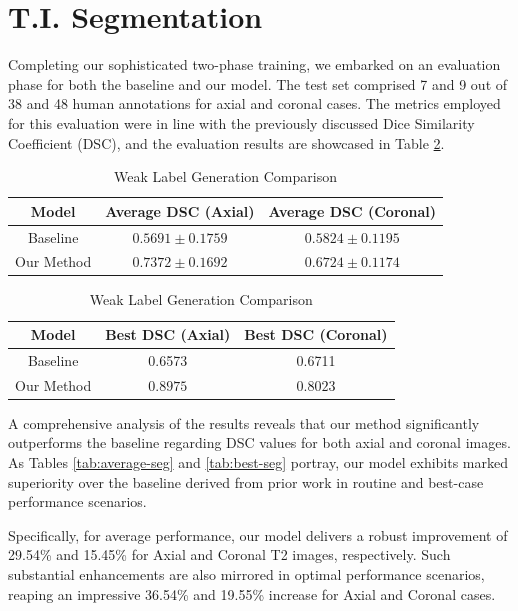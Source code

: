 \section{T.I. Segmentation}
Completing our sophisticated two-phase training, we embarked on an evaluation phase for both the baseline and our model. The test set comprised 7 and 9 out of 38 and 48 human annotations for axial and coronal cases. The metrics employed for this evaluation were in line with the previously discussed Dice Similarity Coefficient (DSC), and the evaluation results are showcased in Table \ref{tab:seg}. 
\begin{table}[ht]
    \begin{subtable}[b]{\textwidth}
        \centering
        \begin{tabular}{c | c | c}
        Model & Average DSC (Axial) & Average DSC (Coronal) \\
        \hline
        Baseline & \(0.5691 \pm 0.1759\)  & \(0.5824 \pm 0.1195\)\\
        \hline
        Our Method & \(\mathbf{0.7372 \pm 0.1692}\) & \(\mathbf{0.6724 \pm 0.1174}\) 
       \end{tabular}
       \caption{Average Case Comparison}
       \label{tab:average-seg}
    \end{subtable}
    \vfill
    \begin{subtable}[b]{\textwidth}
        \centering
        \begin{tabular}{c | c | c}
        Model & Best DSC (Axial) & Best DSC (Coronal) \\
        \hline
        Baseline & 0.6573 & 0.6711\\
        \hline
        Our Method & \(\mathbf{0.8975}\) & \(\mathbf{0.8023}\)
       \end{tabular}
       \caption{Best Case Comparison}
       \label{tab:best-seg}
    \end{subtable}
     \caption{Weak Label Generation Comparison}
     \label{tab:seg}
\end{table}

A comprehensive analysis of the results reveals that our method significantly outperforms the baseline regarding DSC values for both axial and coronal images. As Tables \ref{tab:average-seg} and \ref{tab:best-seg} portray, our model exhibits marked superiority over the baseline derived from prior work in routine and best-case performance scenarios.

Specifically, for average performance, our model delivers a robust improvement of 29.54\% and 15.45\% for Axial and Coronal T2 images, respectively. Such substantial enhancements are also mirrored in optimal performance scenarios, reaping an impressive 36.54\% and 19.55\% increase for Axial and Coronal cases.

